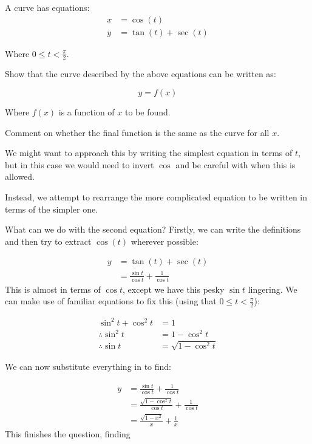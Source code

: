 \begin{example}
    A curve has equations:
    \begin{align*}
        x &= \cos(t)\\
        y &= \tan(t) + \sec(t)
    \end{align*}

    Where $0\leq t < \frac{\pi}{2}$.

    Show that the curve described by the above equations can be written as:

    \[ y = f(x) \]

    Where $f(x)$ is a function of $x$ to be found.

    Comment on whether the final function is the same as the curve for all $x$.
\end{example}

\begin{solution}
    We might want to approach this by writing the simplest equation in terms of $t$, but in this case we would need to invert $\cos$ and be careful with when this is allowed.

    Instead, we attempt to rearrange the more complicated equation to be written in terms of the simpler one.

    What can we do with the second equation? Firstly, we can write the definitions and then try to extract $\cos(t)$ wherever possible:

    \begin{align*}
        y &= \tan(t) + \sec(t)\\
         &= \frac{\sin t}{\cos t} + \frac{1}{\cos t}
    \end{align*}
    This is almost in terms of $\cos t$, except we have this pesky $\sin t$ lingering. We can make use of familiar equations to fix this (using that $0\leq t < \frac{\pi}{2}$):

    \begin{align*}
        \sin^2 t + \cos^2 t&= 1 \\
         \therefore \sin^2 t &= 1 - \cos^2 t \\
         \therefore \sin t &= \sqrt{1 - \cos^2 t}
    \end{align*}

    We can now substitute everything in to find:

    \begin{align*}
        y &= \frac{\sin t}{\cos t} + \frac{1}{\cos t} \\
         &= \frac{\sqrt{1 - \cos^2 t}}{\cos t } + \frac{1}{\cos t} \tag{substituting $\sin t$ above} \\
         &= \frac{\sqrt{1 - x^2}}{x} + \frac{1}{x} \tag{using $x = \cos t$}
    \end{align*}
    This finishes the question, finding 


\end{solution}

